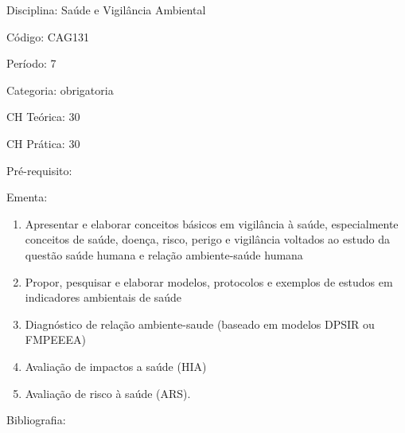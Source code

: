 \documentclass[12pt,a4paper,twoside]{report}
\begin{document}
Disciplina: Saúde e Vigilância Ambiental

Código: CAG131

Período: 7

Categoria: obrigatoria

CH Teórica: 30

CH Prática: 30




Pré-requisito:
\begin{enumerate}
\end{enumerate}

Ementa:
\begin{enumerate}
\item Apresentar e elaborar conceitos básicos em vigilância à saúde, especialmente conceitos de saúde, doença, risco, perigo e vigilância voltados ao estudo da questão saúde humana e relação ambiente-saúde humana
\item Propor, pesquisar e elaborar modelos, protocolos e exemplos de estudos em indicadores ambientais de saúde
\item Diagnóstico de relação ambiente-saude (baseado em modelos DPSIR ou FMPEEEA)
\item Avaliação de impactos a saúde (HIA)
\item Avaliação de risco à saúde (ARS).
\end{enumerate}



Bibliografia:
\end{document}
